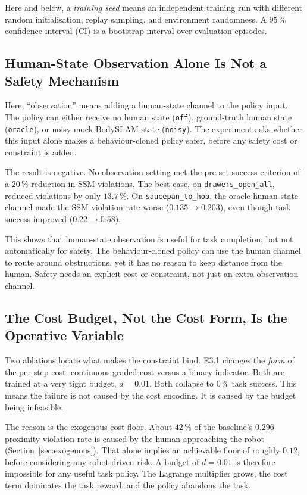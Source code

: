 \documentclass[11pt,a4paper]{report}
\newcommand{\ssm}{SSM}
\newcommand{\bodyslampp}{BodySLAM\nolinebreak[4]\hspace{-.05em}\raisebox{.2ex}{\scriptsize ++}}
\begin{document}
Here and below, a \emph{training seed} means an independent training run
with different random initialisation, replay sampling, and environment
randomness. A 95\,\% confidence interval (CI) is a bootstrap interval
over evaluation episodes.

\subsection{Human-State Observation Alone Is Not a Safety Mechanism}
\label{sec:results:obs-bc}

Here, ``observation'' means adding a human-state channel to the policy
input. The policy can either receive no human state
(\texttt{off}), ground-truth human state (\texttt{oracle}), or noisy
mock-\bodyslampp{} state (\texttt{noisy}). The experiment asks whether
this input alone makes a behaviour-cloned policy safer, before any
safety cost or constraint is added.

The result is negative. No observation setting met the pre-set success
criterion of a $20\,\%$ reduction in \ssm{} violations. The best case,
on \texttt{drawers\_open\_all}, reduced violations by only $13.7\,\%$.
On \texttt{saucepan\_to\_hob}, the oracle human-state channel made the
\ssm{} violation rate worse ($0.135 \to 0.203$), even though task
success improved ($0.22 \to 0.58$).

This shows that human-state observation is useful for task completion,
but not automatically for safety. The behaviour-cloned policy can use
the human channel to route around obstructions, yet it has no reason to
keep distance from the human. Safety needs an explicit cost or
constraint, not just an extra observation channel.

\subsection{The Cost Budget, Not the Cost Form, Is the Operative Variable}
\label{sec:results:cost-signal}
\label{sec:results:budget}

Two ablations locate what makes the constraint bind. E3.1 changes the
\emph{form} of the per-step cost: continuous graded cost versus a
binary indicator. Both are trained at a very tight budget,
$d=0.01$. Both collapse to $0\,\%$ task success. This means the failure
is not caused by the cost encoding. It is caused by the budget being
infeasible.

The reason is the exogenous cost floor. About $42\,\%$ of the
baseline's $0.296$ proximity-violation rate is caused by the human
approaching the robot (Section~\ref{sec:exogenous}). That alone implies
an achievable floor of roughly $0.12$, before considering any
robot-driven risk. A budget of $d=0.01$ is therefore impossible for any
useful task policy. The Lagrange multiplier grows, the cost term
dominates the task reward, and the policy abandons the task.
\end{document}
